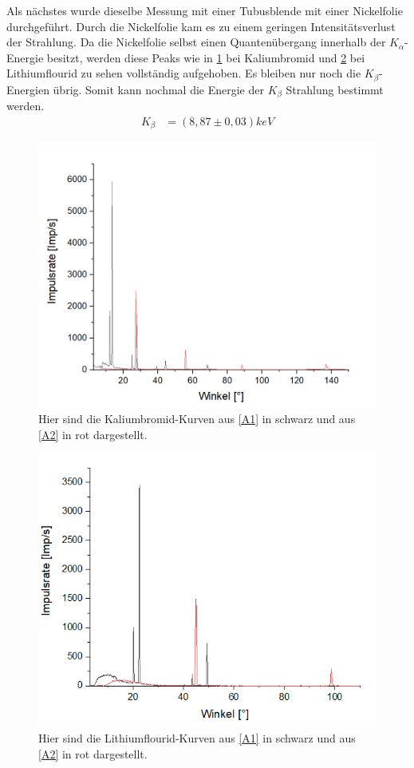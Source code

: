 \documentclass[
	a4paper,
	12pt,
	pagesize,
	ngerman
]{scrartcl}
\begin{document}
Als nächstes wurde dieselbe Messung mit einer Tubusblende mit einer Nickelfolie durchgeführt. Durch die Nickelfolie kam es zu einem geringen Intensitätsverlust der Strahlung. Da die Nickelfolie selbst einen Quantenübergang innerhalb der $K_{\alpha}$-Energie besitzt, werden diese Peaks wie in \cref{A3} bei Kaliumbromid und \cref{A4} bei Lithiumflourid zu sehen vollständig aufgehoben. Es bleiben nur noch die $K_{\beta}$-Energien übrig.
Somit kann nochmal die Energie der $K_{\beta}$ Strahlung bestimmt werden. 
\begin{align*}
    K_{\beta} &= (8,87 \pm 0,03)keV
\end{align*}
\begin{figure}[h!]
    \centering
    \includegraphics[scale = 0.6]{mono-normal.png}
    \caption{Hier sind die Kaliumbromid-Kurven aus \cref{A1} in schwarz und aus \cref{A2} in rot dargestellt.}
    \label{A3}
\end{figure}
\begin{figure}[h!]
    \centering
    \includegraphics[scale = 1]{mono-norlif.png}
    \caption{Hier sind die Lithiumflourid-Kurven aus \cref{A1} in schwarz und aus \cref{A2} in rot dargestellt.}
    \label{A4}
\end{figure}
\end{document}
